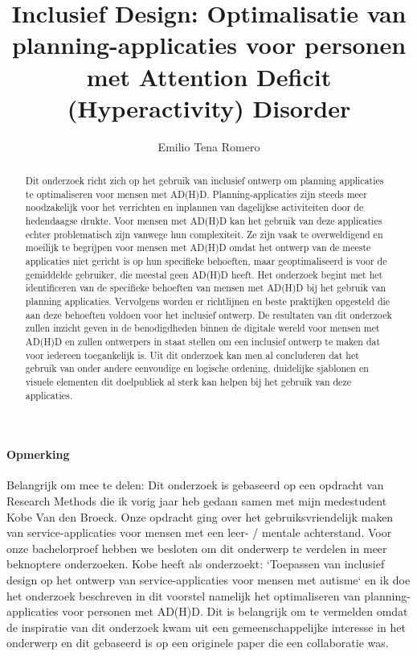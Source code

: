 \documentclass{hogent-article}
\title{Inclusief Design: Optimalisatie van planning-applicaties voor personen met Attention Deficit (Hyperactivity) Disorder}
\author{Emilio Tena Romero}
\begin{document}
\begin{abstract}
  Dit onderzoek richt zich op het gebruik van inclusief ontwerp om planning applicaties te optimaliseren voor mensen met AD(H)D. Planning-applicaties zijn steeds meer noodzakelijk voor het verrichten en inplannen van dagelijkse activiteiten door de hedendaagse drukte. Voor mensen met AD(H)D kan het gebruik van deze applicaties echter problematisch zijn vanwege hun complexiteit. Ze zijn vaak te overweldigend en moeilijk te begrijpen voor mensen met AD(H)D omdat het ontwerp van de meeste applicaties niet gericht is op hun specifieke behoeften, maar geoptimaliseerd is voor de gemiddelde gebruiker, die meestal geen AD(H)D heeft. Het onderzoek begint met het identificeren van de specifieke behoeften van mensen met AD(H)D bij het gebruik van planning applicaties. Vervolgens worden er richtlijnen en beste praktijken opgesteld die aan deze behoeften voldoen voor het inclusief ontwerp. De resultaten van dit onderzoek zullen inzicht geven in de benodigdheden binnen de digitale wereld voor mensen met AD(H)D en zullen ontwerpers in staat stellen om een inclusief ontwerp te maken dat voor iedereen toegankelijk is. Uit dit onderzoek kan men al concluderen dat het gebruik van onder andere eenvoudige en logische ordening, duidelijke sjablonen en visuele elementen dit doelpubliek al sterk kan helpen bij het gebruik van deze applicaties.
\end{abstract}

\tableofcontents


\paragraph{Opmerking}
Belangrijk om mee te delen: \newline
Dit onderzoek is gebaseerd op een opdracht van Research Methods die ik vorig jaar heb gedaan samen met mijn medestudent Kobe Van den Broeck. Onze opdracht ging over het gebruiksvriendelijk maken van service-applicaties voor mensen met een leer- / mentale achterstand.
\newline \newline
Voor onze bachelorproef hebben we besloten om dit onderwerp te verdelen in meer beknoptere onderzoeken. Kobe heeft als onderzoekt: `Toepassen van inclusief design op het ontwerp van service-applicaties voor mensen met autisme` en ik doe het onderzoek beschreven in dit voorstel namelijk het optimaliseren van \newline planning-applicaties voor personen met AD(H)D.
\newline \newline
Dit is belangrijk om te vermelden omdat de inspiratie van dit onderzoek kwam uit een gemeenschappelijke interesse in het onderwerp en dit gebaseerd is op een originele paper die een collaboratie was.  



\printbibliography[heading=bibintoc]
\end{document}

